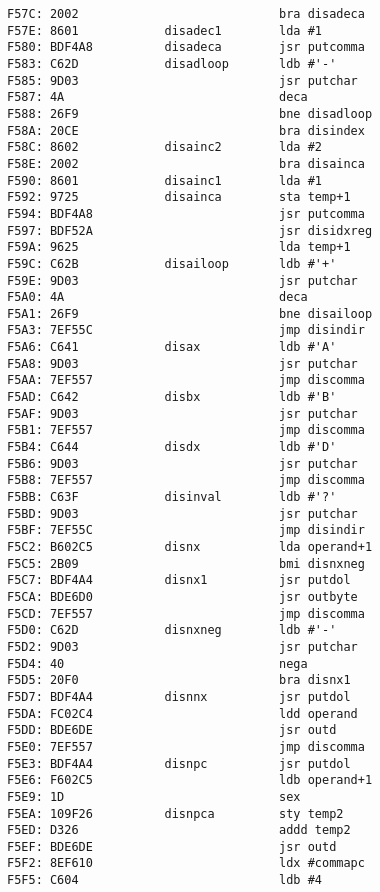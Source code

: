 {\begin{verbatim}
F57C: 2002                            bra disadeca
F57E: 8601            disadec1        lda #1          
F580: BDF4A8          disadeca        jsr putcomma
F583: C62D            disadloop       ldb #'-'
F585: 9D03                            jsr putchar
F587: 4A                              deca
F588: 26F9                            bne disadloop
F58A: 20CE                            bra disindex
F58C: 8602            disainc2        lda #2
F58E: 2002                            bra disainca
F590: 8601            disainc1        lda #1
F592: 9725            disainca        sta temp+1
F594: BDF4A8                          jsr putcomma
F597: BDF52A                          jsr disidxreg           
F59A: 9625                            lda temp+1
F59C: C62B            disailoop       ldb #'+'
F59E: 9D03                            jsr putchar
F5A0: 4A                              deca
F5A1: 26F9                            bne disailoop
F5A3: 7EF55C                          jmp disindir
F5A6: C641            disax           ldb #'A'
F5A8: 9D03                            jsr putchar
F5AA: 7EF557                          jmp discomma
F5AD: C642            disbx           ldb #'B'
F5AF: 9D03                            jsr putchar
F5B1: 7EF557                          jmp discomma
F5B4: C644            disdx           ldb #'D'
F5B6: 9D03                            jsr putchar
F5B8: 7EF557                          jmp discomma
F5BB: C63F            disinval        ldb #'?'
F5BD: 9D03                            jsr putchar
F5BF: 7EF55C                          jmp disindir
F5C2: B602C5          disnx           lda operand+1
F5C5: 2B09                            bmi disnxneg
F5C7: BDF4A4          disnx1          jsr putdol
F5CA: BDE6D0                          jsr outbyte
F5CD: 7EF557                          jmp discomma
F5D0: C62D            disnxneg        ldb #'-'
F5D2: 9D03                            jsr putchar
F5D4: 40                              nega
F5D5: 20F0                            bra disnx1
F5D7: BDF4A4          disnnx          jsr putdol
F5DA: FC02C4                          ldd operand
F5DD: BDE6DE                          jsr outd
F5E0: 7EF557                          jmp discomma
F5E3: BDF4A4          disnpc          jsr putdol
F5E6: F602C5                          ldb operand+1
F5E9: 1D                              sex
F5EA: 109F26          disnpca         sty temp2
F5ED: D326                            addd temp2
F5EF: BDE6DE                          jsr outd
F5F2: 8EF610                          ldx #commapc
F5F5: C604                            ldb #4

\end{verbatim}}
